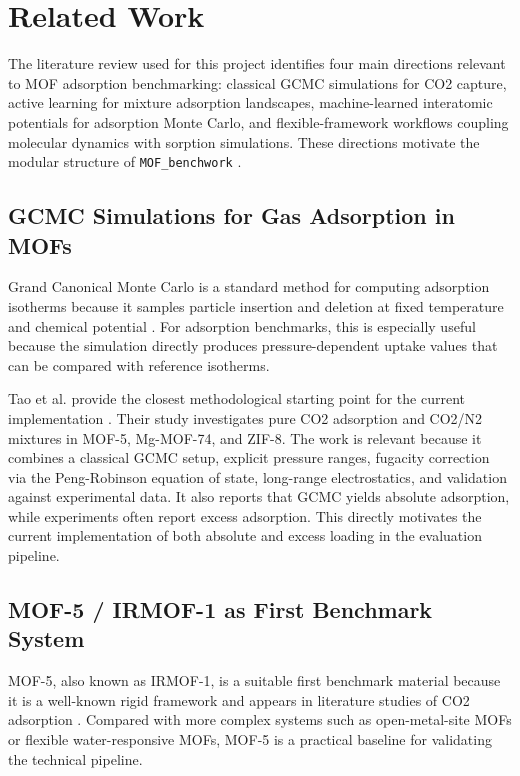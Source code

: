 \section{Related Work}

The literature review used for this project identifies four main directions relevant to MOF adsorption benchmarking:
classical GCMC simulations for CO2 capture, active learning for mixture adsorption landscapes, machine-learned interatomic potentials for adsorption Monte Carlo, and flexible-framework workflows coupling molecular dynamics with sorption simulations.
These directions motivate the modular structure of \texttt{MOF\_benchwork} \cite{tao2022gcmc,mukherjee2023active,edwards2026mlipmc,wang2026flexible}.

\subsection{GCMC Simulations for Gas Adsorption in MOFs}

Grand Canonical Monte Carlo is a standard method for computing adsorption isotherms because it samples particle insertion and deletion at fixed temperature and chemical potential \cite{tao2022gcmc,mukherjee2023active,edwards2026mlipmc}.
For adsorption benchmarks, this is especially useful because the simulation directly produces pressure-dependent uptake values that can be compared with reference isotherms.

Tao et al. provide the closest methodological starting point for the current implementation \cite{tao2022gcmc}.
Their study investigates pure CO2 adsorption and CO2/N2 mixtures in MOF-5, Mg-MOF-74, and ZIF-8.
The work is relevant because it combines a classical GCMC setup, explicit pressure ranges, fugacity correction via the Peng-Robinson equation of state, long-range electrostatics, and validation against experimental data.
It also reports that GCMC yields absolute adsorption, while experiments often report excess adsorption.
This directly motivates the current implementation of both absolute and excess loading in the evaluation pipeline.

\subsection{MOF-5 / IRMOF-1 as First Benchmark System}

MOF-5, also known as IRMOF-1, is a suitable first benchmark material because it is a well-known rigid framework and appears in literature studies of CO2 adsorption \cite{tao2022gcmc,crafted2023}.
Compared with more complex systems such as open-metal-site MOFs or flexible water-responsive MOFs, MOF-5 is a practical baseline for validating the technical pipeline.


